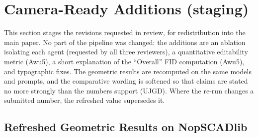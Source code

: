 %
%
%

\clearpage
\renewcommand{\thetable}{R\arabic{table}}
\setcounter{table}{0}

\section{Camera-Ready Additions (staging)}
\label{app:rebuttal}

This section stages the revisions requested in review, for redistribution into the main paper. No part of the pipeline was changed: the additions are an ablation isolating each agent (requested by all three reviewers), a quantitative editability metric (Awu5), a short explanation of the ``Overall'' FID computation (Awu5), and typographic fixes. The geometric results are recomputed on the same models and prompts, and the comparative wording is softened so that claims are stated no more strongly than the numbers support (UJGD). Where the re-run changes a submitted number, the refreshed value supersedes it.

\subsection{Refreshed Geometric Results on NopSCADlib}
\label{subsec:refreshed}

